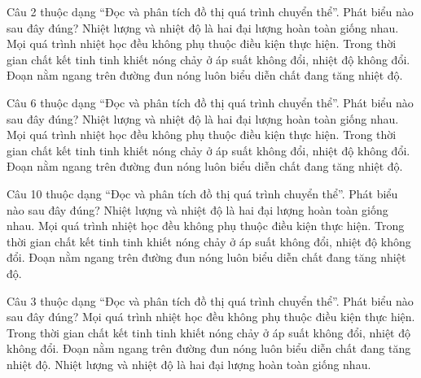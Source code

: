 \begin{ex}
Câu 2 thuộc dạng “Đọc và phân tích đồ thị quá trình chuyển thể”. Phát biểu nào sau đây đúng?
\choice
{Nhiệt lượng và nhiệt độ là hai đại lượng hoàn toàn giống nhau.}
{Mọi quá trình nhiệt học đều không phụ thuộc điều kiện thực hiện.}
{\True Trong thời gian chất kết tinh tinh khiết nóng chảy ở áp suất không đổi, nhiệt độ không đổi.}
{Đoạn nằm ngang trên đường đun nóng luôn biểu diễn chất đang tăng nhiệt độ.}
\end{ex}

\begin{ex}
Câu 6 thuộc dạng “Đọc và phân tích đồ thị quá trình chuyển thể”. Phát biểu nào sau đây đúng?
\choice
{Nhiệt lượng và nhiệt độ là hai đại lượng hoàn toàn giống nhau.}
{Mọi quá trình nhiệt học đều không phụ thuộc điều kiện thực hiện.}
{\True Trong thời gian chất kết tinh tinh khiết nóng chảy ở áp suất không đổi, nhiệt độ không đổi.}
{Đoạn nằm ngang trên đường đun nóng luôn biểu diễn chất đang tăng nhiệt độ.}
\end{ex}

\begin{ex}
Câu 10 thuộc dạng “Đọc và phân tích đồ thị quá trình chuyển thể”. Phát biểu nào sau đây đúng?
\choice
{Nhiệt lượng và nhiệt độ là hai đại lượng hoàn toàn giống nhau.}
{Mọi quá trình nhiệt học đều không phụ thuộc điều kiện thực hiện.}
{\True Trong thời gian chất kết tinh tinh khiết nóng chảy ở áp suất không đổi, nhiệt độ không đổi.}
{Đoạn nằm ngang trên đường đun nóng luôn biểu diễn chất đang tăng nhiệt độ.}
\end{ex}

\begin{ex}
Câu 3 thuộc dạng “Đọc và phân tích đồ thị quá trình chuyển thể”. Phát biểu nào sau đây đúng?
\choice
{Mọi quá trình nhiệt học đều không phụ thuộc điều kiện thực hiện.}
{\True Trong thời gian chất kết tinh tinh khiết nóng chảy ở áp suất không đổi, nhiệt độ không đổi.}
{Đoạn nằm ngang trên đường đun nóng luôn biểu diễn chất đang tăng nhiệt độ.}
{Nhiệt lượng và nhiệt độ là hai đại lượng hoàn toàn giống nhau.}
\end{ex}

